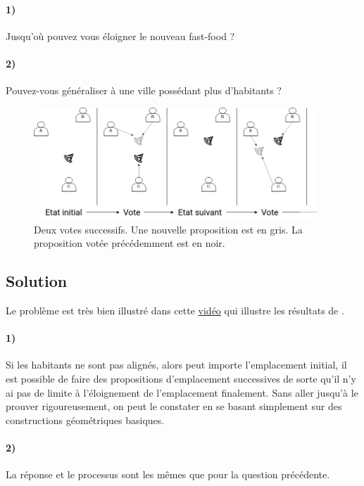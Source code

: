 \documentclass[a4paper,10pt,oneside]{article}
\begin{document}
\paragraph*{1)} 
Jusqu'où pouvez vous éloigner le nouveau fast-food ?

\paragraph*{2)} 
Pouvez-vous généraliser à une ville possédant plus d'habitants ?


\begin{figure}[!h]
  \centering
  \includegraphics*[width=0.95\textwidth]{figures/democracy.png}
  \caption{Deux votes successifs. Une nouvelle proposition est en gris. La proposition votée précédemment est en noir.}
\end{figure}


\subsection{Solution}

Le problème est très bien illustré dans cette \href{https://www.youtube.com/watch?v=goQ4ii-zBMw}{vidéo} qui illustre les résultats de \cite{MCKELVEY1976472}.

\paragraph*{1)} 
Si les habitants ne sont pas alignés, alors peut importe l'emplacement initial, il est possible de faire des propositions d'emplacement successives de sorte qu'il n'y ai pas de limite à l'éloignement de l'emplacement finalement.
Sans aller jusqu'à le prouver rigoureusement, on peut le constater en se basant simplement sur des constructions géométriques basiques.

\paragraph*{2)}
La réponse et le processus sont les mêmes que pour la question précédente.
\end{document}
